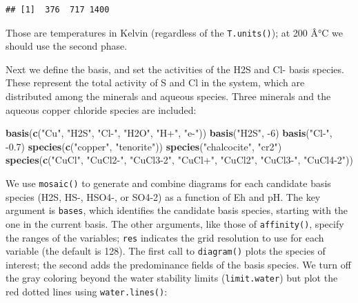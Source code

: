 \documentclass[]{tufte-handout}
\newenvironment{Shaded}{}{}
\newcommand{\KeywordTok}[1]{\textcolor[rgb]{0.00,0.44,0.13}{\textbf{#1}}}
\newcommand{\DecValTok}[1]{\textcolor[rgb]{0.25,0.63,0.44}{#1}}
\newcommand{\FloatTok}[1]{\textcolor[rgb]{0.25,0.63,0.44}{#1}}
\newcommand{\StringTok}[1]{\textcolor[rgb]{0.25,0.44,0.63}{#1}}
\newcommand{\OperatorTok}[1]{\textcolor[rgb]{0.40,0.40,0.40}{#1}}
\newcommand{\NormalTok}[1]{#1}
\begin{document}
\begin{verbatim}
## [1]  376  717 1400
\end{verbatim}

Those are temperatures in Kelvin (regardless of the
{\texttt{T.units()}}); at 200 Â°C we should use the second phase.

Next we define the basis, and set the activities of the H2S and Cl-
basis species. These represent the total activity of S and Cl in the
system, which are distributed among the minerals and aqueous species.
Three minerals and the aqueous copper chloride species are included:

\begin{Shaded}
\begin{Highlighting}[]
\KeywordTok{basis}\NormalTok{(}\KeywordTok{c}\NormalTok{(}\StringTok{"Cu"}\NormalTok{, }\StringTok{"H2S"}\NormalTok{, }\StringTok{"Cl-"}\NormalTok{, }\StringTok{"H2O"}\NormalTok{, }\StringTok{"H+"}\NormalTok{, }\StringTok{"e-"}\NormalTok{))}
\KeywordTok{basis}\NormalTok{(}\StringTok{"H2S"}\NormalTok{, }\OperatorTok{-}\DecValTok{6}\NormalTok{)}
\KeywordTok{basis}\NormalTok{(}\StringTok{"Cl-"}\NormalTok{, }\OperatorTok{-}\FloatTok{0.7}\NormalTok{)}
\KeywordTok{species}\NormalTok{(}\KeywordTok{c}\NormalTok{(}\StringTok{"copper"}\NormalTok{, }\StringTok{"tenorite"}\NormalTok{))}
\KeywordTok{species}\NormalTok{(}\StringTok{"chalcocite"}\NormalTok{, }\StringTok{"cr2"}\NormalTok{)}
\KeywordTok{species}\NormalTok{(}\KeywordTok{c}\NormalTok{(}\StringTok{"CuCl"}\NormalTok{, }\StringTok{"CuCl2-"}\NormalTok{, }\StringTok{"CuCl3-2"}\NormalTok{, }\StringTok{"CuCl+"}\NormalTok{, }\StringTok{"CuCl2"}\NormalTok{, }\StringTok{"CuCl3-"}\NormalTok{, }\StringTok{"CuCl4-2"}\NormalTok{))}
\end{Highlighting}
\end{Shaded}

We use {\texttt{mosaic()}} to generate and combine diagrams for each
candidate basis species (H2S, HS-, HSO4-, or SO4-2) as a function of Eh
and pH. The key argument is \texttt{bases}, which identifies the
candidate basis species, starting with the one in the current basis. The
other arguments, like those of {\texttt{affinity()}}, specify the ranges
of the variables; \texttt{res} indicates the grid resolution to use for
each variable (the default is 128). The first call to
{\texttt{diagram()}} plots the species of interest; the second adds the
predominance fields of the basis species. We turn off the gray coloring
beyond the water stability limits (\texttt{limit.water}) but plot the
red dotted lines using {\texttt{water.lines()}}:
\end{document}
